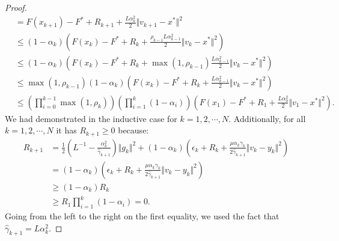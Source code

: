 \documentclass[12pt]{article}
\begin{document}
\begin{proof}
{\begin{align*}
            &=
            F(x_{k + 1}) - F^* + R_{k + 1} + \frac{L \alpha_k^2}{2}\Vert v_{k + 1} - x^*\Vert^2
            \\
            &\le 
            (1 - \alpha_k)
            \left(
                F(x_k) - F^* + R_k + \frac{\rho_{k - 1}L \alpha_{k - 1}^2}{2}\Vert v_k - x^*\Vert^2
            \right)
            \\
            &\le 
            (1 - \alpha_k)
            \left(
                F(x_k) - F^* + R_k + \max(1, \rho_{k - 1})\frac{L \alpha_{k - 1}^2}{2}\Vert v_k - x^*\Vert^2
            \right)
            \\
            &\le 
            \max(1, \rho_{k - 1})(1 - \alpha_k)
            \left(
                F(x_k) - F^* + R_k + \frac{L \alpha_{k - 1}^2}{2}\Vert v_k - x^*\Vert^2
            \right)
            \\
            &\le 
            \left(
                \prod_{i = 0}^{k - 1} \max(1, \rho_{k})
            \right)
            \left(
                \prod_{i = 1}^{k} \left(1  - \alpha_i\right)
            \right)
            \left(
                F(x_1) - F^* + R_1 + \frac{L\alpha_0^2}{2}\Vert v_1 - x^*\Vert^2
            \right). 
        \end{align*}
        }
        We had demonstrated in the inductive case for $k=1, 2, \cdots, N$. 
        Additionally, for all $k = 1, 2, \cdots, N$ it has $R_{k + 1} \ge 0$ because: 
        \begin{align*}
            R_{k + 1}
            &= 
            \frac{1}{2}\left(
                L^{-1} - \frac{\alpha_k^2}{\hat \gamma_{k + 1}}
            \right)\Vert g_k\Vert^2
            + 
            (1 - \alpha_k)
            \left(
                \epsilon_k + R_k + 
                \frac{\mu\alpha_k\gamma_k}{2\hat \gamma_{k + 1}}
                \Vert v_k - y_k\Vert^2
            \right)
            \\
            &= (1 - \alpha_k)
            \left(
                \epsilon_k + R_k 
                + \frac{\mu\alpha_k\gamma_k}{2\hat \gamma_{k + 1}}
                \Vert v_k - y_k\Vert^2
            \right)
            \\
            &\ge 
            (1 - \alpha_k) R_k
            \\
            &\ge R_1 \prod_{i = 1}^{k} \left(1 - \alpha_i\right) = 0. 
        \end{align*}
        Going from the left to the right on the first equality, we used the fact that $\hat \gamma_{k + 1} = L \alpha_{k}^2$.

\end{proof}
\end{document}
